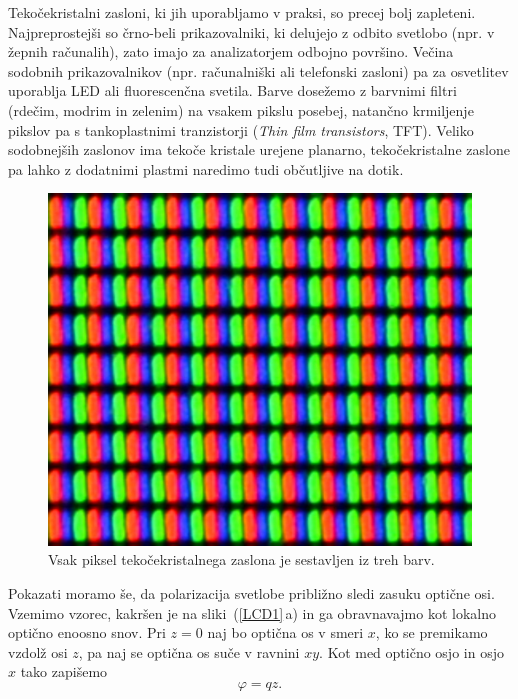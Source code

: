 \begin{remark}
Tekočekristalni zasloni, ki jih uporabljamo v praksi, so precej bolj zapleteni.
Najpreprostejši so črno-beli prikazovalniki, ki delujejo z odbito svetlobo (npr. 
v žepnih računalih), zato imajo za analizatorjem odbojno površino. Večina 
sodobnih prikazovalnikov (npr. računalniški ali telefonski zasloni) pa za 
osvetlitev uporablja LED ali fluorescenčna svetila.
Barve dosežemo z barvnimi filtri (rdečim, modrim in zelenim) na vsakem 
pikslu posebej, natančno krmiljenje pikslov pa s tankoplastnimi 
tranzistorji ({\it Thin film transistors}, TFT). Veliko
sodobnejših zaslonov ima tekoče kristale urejene planarno, tekočekristalne 
zaslone pa lahko z dodatnimi plastmi naredimo tudi občutljive na dotik.
\begin{figure}[h!]
\centering
\includegraphics[width=63truemm]{slike/09_LCD.jpg}
\caption{Vsak piksel tekočekristalnega zaslona je sestavljen iz treh barv.}
\end{figure}
\end{remark}

Pokazati moramo še, da polarizacija svetlobe približno sledi zasuku optične osi. 
Vzemimo vzorec, kakršen je na sliki~(\ref{LCD1}\,a) in ga obravnavajmo
kot lokalno optično enoosno snov. Pri $z=0$ naj bo optična
os v smeri $x$, ko se premikamo vzdolž osi $z$, pa naj se optična os suče
v ravnini $xy$. Kot med optično osjo in osjo $x$ tako zapišemo 
\begin{equation}
\varphi=qz.
\label{7.58}
\end{equation}

